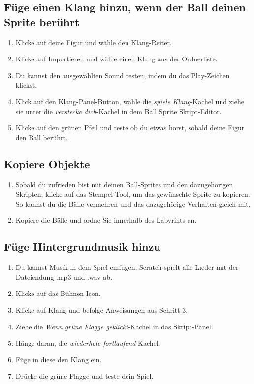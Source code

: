 \subsection{Füge einen Klang hinzu, wenn der Ball deinen Sprite berührt}
\begin{enumerate}
\item Klicke auf deine Figur und wähle den Klang-Reiter.
\item Klicke auf Importieren und wähle einen Klang aus der Ordnerliste.
\item Du kannst den ausgewählten Sound testen, indem du das Play-Zeichen klickst.
\item Klick auf den Klang-Panel-Button, wähle die \textit{spiele Klang}-Kachel und ziehe sie unter die \textit{verstecke dich}-Kachel in dem Ball Sprite Skript-Editor.
\item Klicke auf den grünen Pfeil und teste ob du etwas horst, sobald deine Figur den Ball berührt.
\end{enumerate}


\subsection{Kopiere Objekte}
\begin{enumerate}
\item Sobald du zufrieden bist mit deinen Ball-Sprites und den dazugehörigen Skripten, klicke auf das Stempel-Tool, um das gewünschte Sprite zu kopieren. So kannst du die Bälle vermehren und das dazugehörige Verhalten gleich mit.
\item Kopiere die Bälle und ordne Sie innerhalb des Labyrints an.
\end{enumerate}


\subsection{Füge Hintergrundmusik hinzu}
\begin{enumerate}
\item Du kannst Musik in dein Spiel einfügen. Scratch spielt alle Lieder mit der Dateiendung .mp3 und .wav ab.
\item Klicke auf das Bühnen Icon.
\item Klicke auf Klang und befolge Anweisungen aus Schritt 3.
\item Ziehe die \textit{Wenn grüne Flagge geklickt}-Kachel in das Skript-Panel.
\item Hänge daran, die \textit{wiederhole fortlaufend}-Kachel.
\item Füge in diese den Klang ein.
\item Drücke die grüne Flagge und teste dein Spiel.
\end{enumerate}